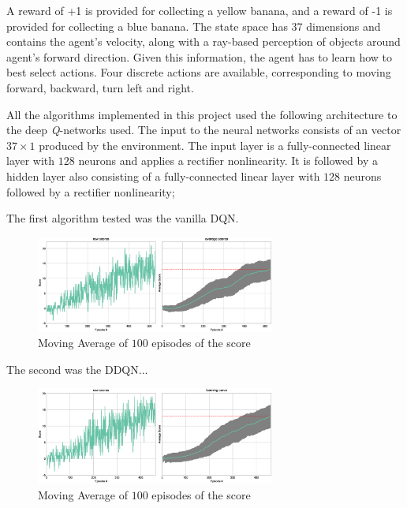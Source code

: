 \documentclass[a4paper]{article}
\begin{document}
A reward of +1 is provided for collecting a yellow banana, and a reward of -1 is provided for collecting a blue banana. The state space has 37 dimensions and contains the agent’s velocity, along with a ray-based perception of objects around agent’s forward direction. Given this information, the agent has to learn how to best select actions. Four discrete actions are available, corresponding to moving forward, backward, turn left and right.

All the algorithms implemented in this project used the following architecture to the deep \textit{Q}-networks used. The input to the neural networks consists of an vector $37 \times 1$ produced by the environment. The input layer is a fully-connected linear layer with $128$ neurons and applies a rectifier nonlinearity. It is followed by a hidden layer also consisting of a fully-connected linear layer with $128$ neurons followed by a rectifier nonlinearity;




The first algorithm tested was the vanilla DQN.

\begin{figure}[ht]
\centering
\includegraphics[width=0.7\textwidth]{../notebooks/figures/2018-08-24-dqn.eps}
\caption{Moving Average of $100$ episodes of the score}
\label{fig:dqn}
\end{figure}


The second was the DDQN...

\begin{figure}[ht]
\centering
\includegraphics[width=0.7\textwidth]{../notebooks/figures/2018-08-24-ddqn-learning-curve.eps}
\caption{Moving Average of $100$ episodes of the score}
\label{fig:ddqn}
\end{figure}
\end{document}
